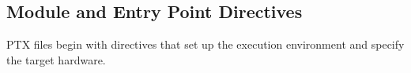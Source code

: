 \subsection{Module and Entry Point Directives}

PTX files begin with directives that set up the execution environment and specify the target hardware.

